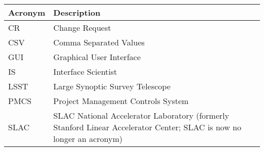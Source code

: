 \addtocounter{table}{-1}
\begin{longtable}{p{}p{}}\hline
\textbf{Acronym} & \textbf{Description}  \\\hline

CR & Change Request \\\hline
CSV & Comma Separated Values \\\hline
GUI & Graphical User Interface \\\hline
IS & Interface Scientist \\\hline
LSST & Large Synoptic Survey Telescope \\\hline
PMCS & Project Management Controls System \\\hline
SLAC & SLAC National Accelerator Laboratory (formerly Stanford Linear Accelerator Center; SLAC is now no longer an acronym) \\\hline
\end{longtable}
